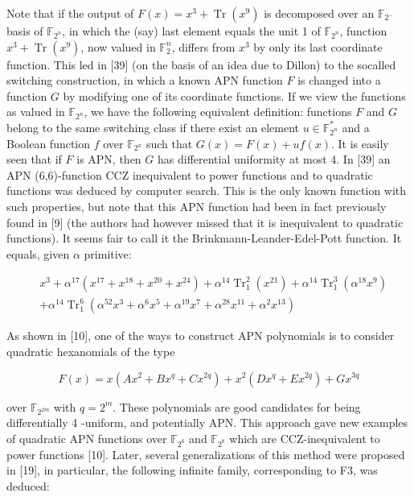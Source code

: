 \documentclass[10pt]{article}
\begin{document}
Note that if the output of $F(x)=x^{3}+\operatorname{Tr}\left(x^{9}\right)$ is decomposed over an $\mathbb{F}_{2^{-}}$ basis of $\mathbb{F}_{2^{n}}$, in which the (say) last element equals the unit 1 of $\mathbb{F}_{2^{n}}$, function $x^{3}+\operatorname{Tr}\left(x^{9}\right)$, now valued in $\mathbb{F}_{2}^{n}$, differs from $x^{3}$ by only its last coordinate function. This led in [39] (on the basis of an idea due to Dillon) to the socalled switching construction, in which a known APN function $F$ is changed into a function $G$ by modifying one of its coordinate functions. If we view the functions as valued in $\mathbb{F}_{2^{n}}$, we have the following equivalent definition: functions $F$ and $G$ belong to the same switching class if there exist an element $u \in \mathbb{F}_{2^{n}}^{*}$ and a Boolean function $f$ over $\mathbb{F}_{2^{n}}$ such that $G(x)=F(x)+u f(x)$. It is easily seen that if $F$ is APN, then $G$ has differential uniformity at most 4. In [39] an APN (6,6)-function CCZ inequivalent to power functions and to quadratic functions was deduced by computer search. This is the only known function with such properties, but note that this APN function had been in fact previously found in [9] (the authors had however missed that it is inequivalent to quadratic functions). It seems fair to call it the Brinkmann-Leander-Edel-Pott function. It equals, given $\alpha$ primitive:

$$
\begin{aligned}
& x^{3}+\alpha^{17}\left(x^{17}+x^{18}+x^{20}+x^{24}\right)+\alpha^{14} \operatorname{Tr}_{1}^{2}\left(x^{21}\right)+\alpha^{14} \operatorname{Tr}_{1}^{3}\left(\alpha^{18} x^{9}\right) \\
& +\alpha^{14} \operatorname{Tr}_{1}^{6}\left(\alpha^{52} x^{3}+\alpha^{6} x^{5}+\alpha^{19} x^{7}+\alpha^{28} x^{11}+\alpha^{2} x^{13}\right)
\end{aligned}
$$

As shown in [10], one of the ways to construct APN polynomials is to consider quadratic hexanomials of the type


\begin{equation*}
F(x)=x\left(A x^{2}+B x^{q}+C x^{2 q}\right)+x^{2}\left(D x^{q}+E x^{2 q}\right)+G x^{3 q} \tag{3.1}
\end{equation*}


over $\mathbb{F}_{2^{2 m}}$ with $q=2^{m}$. These polynomials are good candidates for being differentially 4 -uniform, and potentially APN. This approach gave new examples of quadratic APN functions over $\mathbb{F}_{2^{6}}$ and $\mathbb{F}_{2^{8}}$ which are CCZ-inequivalent to power functions [10]. Later, several generalizations of this method were proposed in [19], in particular, the following infinite family, corresponding to F3, was deduced:
\end{document}
